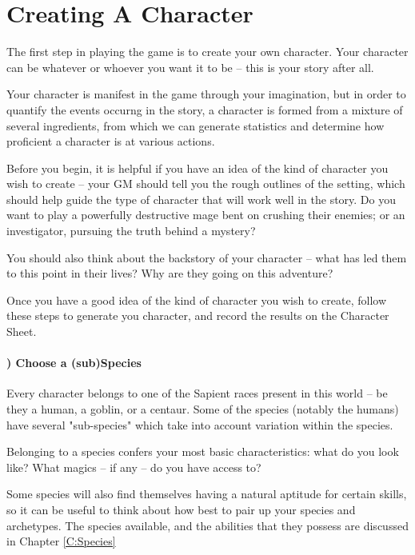 \newcommand\itemlist{\stepcounter{itemlist} \theitemlist)}


\chapter{Creating A Character}

The first step in playing the game is to create your own character. Your character can be whatever or whoever you want it to be -- this is your story after all. 

Your character is manifest in the game through your imagination, but in order to quantify the events occurng in the story, a character is formed from a mixture of several ingredients, from which we can generate statistics and determine how proficient a character is at various actions. 

Before you begin, it is helpful if you have an idea of the kind of character you wish to create -- your GM should tell you the rough outlines of the setting, which should help guide the type of character that will work well in the story. Do you want to play a powerfully destructive mage bent on crushing their enemies; or an investigator, pursuing the truth behind a mystery? 

You should also think about the backstory of your character -- what has led them to this point in their lives? Why are they going on this adventure?  

Once you have a good idea of the kind of character you wish to create, follow these steps to generate you character, and record the results on the Character Sheet.

\subsubsection*{\itemlist{} Choose a (sub)Species}

Every character belongs to one of the Sapient races present in this world -- be they a human, a goblin, or a centaur. Some of the species (notably the humans) have several "sub-species" which take into account variation within the species. 

Belonging to a species confers your most basic characteristics: what do you look like? What magics -- if any -- do you have access to? 

Some species will also find themselves having a natural aptitude for certain skills, so it can be useful to think about how best to pair up your species and archetypes. The species available, and the abilities that they possess are discussed in Chapter \ref{C:Species}

